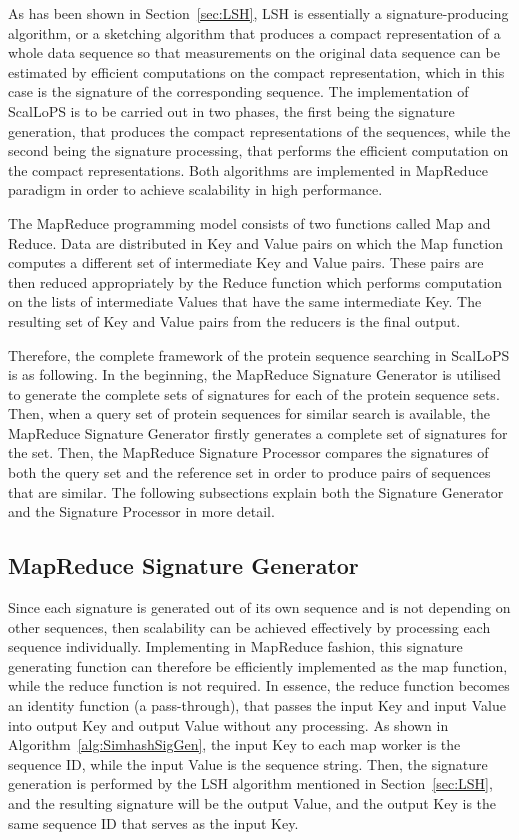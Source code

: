 \documentclass[titlepage]{csetr}
\begin{document}
As has been shown in Section~\ref{sec:LSH}, LSH is essentially a signature-producing algorithm, or a sketching algorithm that produces a compact representation of a whole data sequence so that measurements on the original data sequence can be estimated by efficient computations on the compact representation, which in this case is the signature of the corresponding sequence. The implementation of ScalLoPS is to be carried out in two phases, the first being the signature generation, that produces the compact representations of the sequences, while the second being the signature processing, that performs the efficient computation on the compact representations. Both algorithms are implemented in MapReduce paradigm in order to achieve scalability in high performance.

The MapReduce programming model consists of two functions called Map and Reduce. Data are distributed in Key and Value pairs on which the Map function computes a different set of intermediate Key and Value pairs. These pairs are then reduced appropriately by the Reduce function which performs computation on the lists of intermediate Values that have the same intermediate Key. The resulting set of Key and Value pairs from the reducers is the final output.

Therefore, the complete framework of the protein sequence searching in ScalLoPS is as following. In the beginning, the MapReduce Signature Generator is utilised to generate the complete sets of signatures for each of the protein sequence sets. Then, when a query set of protein sequences for similar search is available, the MapReduce Signature Generator firstly generates a complete set of signatures for the set. Then, the MapReduce Signature Processor compares the signatures of both the query set and the reference set in order to produce pairs of sequences that are similar. The following subsections explain both the Signature Generator and the Signature Processor in more detail.

\subsection{MapReduce Signature Generator}

Since each signature is generated out of its own sequence and is not depending on other sequences, then scalability  can be achieved effectively by processing each sequence individually. Implementing in MapReduce fashion, this signature generating function can therefore be efficiently implemented as the map function, while the reduce function is not required. In essence, the reduce function becomes an identity function (a pass-through), that passes the input Key and input Value into output Key and output Value without any processing. As shown in Algorithm~\ref{alg:SimhashSigGen}, the input Key to each map worker is the sequence ID, while the input Value is the sequence string. Then, the signature generation is performed by the LSH algorithm mentioned in Section~\ref{sec:LSH}, and the resulting signature will be the output Value, and the output Key is the same sequence ID that serves as the input Key.
\end{document}
